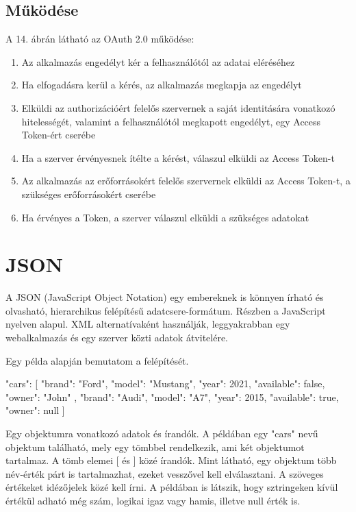 \subsection*{Működése} 

A 14. ábrán látható az OAuth 2.0 működése: 



\begin{enumerate}
\item Az alkalmazás engedélyt kér a felhasználótól az adatai eléréséhez 
\item Ha elfogadásra kerül a kérés, az alkalmazás megkapja az engedélyt 
\item Elküldi az authorizációért felelős szervernek a saját identitására vonatkozó hitelességét, valamint a felhasználótól megkapott engedélyt, egy Access Token-ért cserébe 
\item Ha a szerver érvényesnek ítélte a kérést, válaszul elküldi az Access Token-t 
\item Az alkalmazás az erőforrásokért felelős szervernek elküldi az Access Token-t, a szükséges erőforrásokért cserébe 
\item Ha érvényes a Token, a szerver válaszul elküldi a szükséges adatokat 
\end{enumerate}


\section{JSON}

A JSON (JavaScript Object Notation) egy embereknek is könnyen írható és olvasható, hierarchikus felépítésű adatcsere-formátum. Részben a JavaScript nyelven alapul. XML alternatívaként használják, leggyakrabban egy webalkalmazás és egy szerver közti adatok átvitelére. 

Egy példa alapján bemutatom a felépítését. 

{"cars": [{ 
"brand": "Ford", 
"model": "Mustang", 
"year": 2021, 
"available": false, 
"owner": "John" 
        }, { 
"brand": "Audi", 
"model": "A7", 
"year": 2015, 
"available": true, 
"owner": null 
        } 
]} 

Egy objektumra vonatkozó adatok { és } írandók. A példában egy "cars" nevű objektum található, mely egy tömbbel rendelkezik, ami két objektumot tartalmaz. A tömb elemei [ és ] közé írandók. Mint látható, egy objektum több név-érték párt is tartalmazhat, ezeket vesszővel kell elválasztani. A szöveges értékeket idézőjelek közé kell írni. A példában is látszik, hogy sztringeken kívül értékül adható még szám, logikai igaz vagy hamis, illetve null érték is. 

